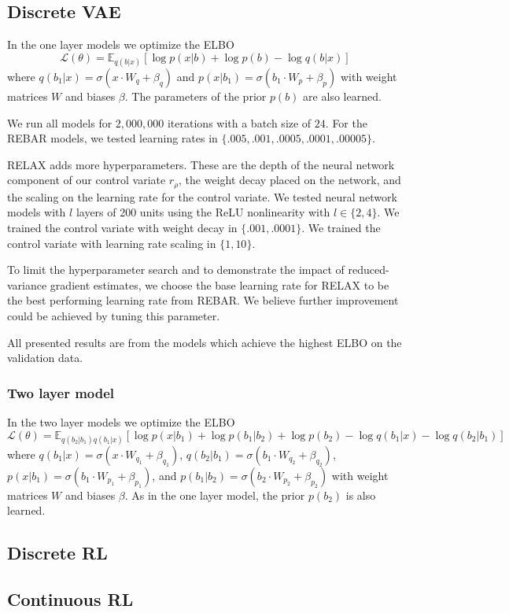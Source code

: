 \documentclass{article}
\newcommand{\E}{\mathbb{E}}
\begin{document}
\subsection{Discrete VAE}
\label{app_disc_vae}
In the one layer models we optimize the ELBO $$\mathcal{L}(\theta) = \E_{q(b|x)}[\log p(x|b) + \log p(b) - \log q(b|x)]$$ where $q(b_1|x) = \sigma(x\cdot W_q + \beta_q)$ and $p(x| b_1) = \sigma(b_1\cdot W_p + \beta_p)$ with weight matrices $W$ and biases $\beta$.
The parameters of the prior $p(b)$ are also learned.

We run all models for $2,000,000$ iterations with a batch size of $24$. For the REBAR models, we tested learning rates in $\{.005, .001, .0005,  .0001, .00005\}$. 

RELAX adds more hyperparameters.
These are the depth of the neural network component of our control variate $r_\rho$, the weight decay placed on the network, and the scaling on the learning rate for the control variate.
We tested neural network models with $l$ layers of 200 units using the ReLU nonlinearity with $l \in \{2, 4\}$.
We trained the control variate with weight decay in $\{.001, .0001\}$. We trained the control variate with learning rate scaling in $\{1, 10\}$.

To limit the hyperparameter search and to demonstrate the impact of reduced-variance gradient estimates, we choose the base learning rate for RELAX to be the best performing learning rate from REBAR.
We believe further improvement could be achieved by tuning this parameter.

All presented results are from the models which achieve the highest ELBO on the validation data.

\subsubsection{Two layer model}
In the two layer models we optimize the ELBO $$\mathcal{L}(\theta) = \E_{q(b_2|b_1)q(b_1|x)}[\log p(x|b_1) + \log p(b_1|b_2) + \log p(b_2) - \log q(b_1|x) - \log q(b_2|b_1)]$$ where $q(b_1|x) = \sigma(x\cdot W_{q_1} + \beta_{q_1})$, $q(b_2|b_1) = \sigma(b_1\cdot W_{q_2} + \beta_{q_2})$, $p(x| b_1) = \sigma(b_1\cdot W_{p_1} + \beta_{p_1})$, and $p(b_1| b_2) = \sigma(b_2\cdot W_{p_2} + \beta_{p_2})$ with weight matrices $W$ and biases $\beta$. As in the one layer model, the prior $p(b_2)$ is also learned.


\subsection{Discrete RL}
\subsection{Continuous RL}
\end{document}

